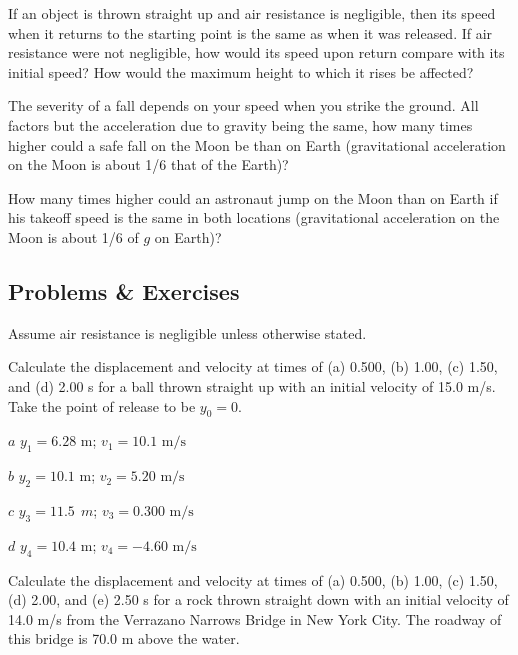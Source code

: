 \documentclass[
]{book}
\begin{document}
\hypertarget{fs-id1773324}{}
\leavevmode{}%
If an object is thrown straight up and air resistance is negligible,
then its speed when it returns to the starting point is the same as when
it was released. If air resistance were not negligible, how would its
speed upon return compare with its initial speed? How would the maximum
height to which it rises be affected?

\hypertarget{fs-id1776230}{}
\leavevmode{}%
The severity of a fall depends on your speed when you strike the ground.
All factors but the acceleration due to gravity being the same, how many
times higher could a safe fall on the Moon be than on Earth
(gravitational acceleration on the Moon is about 1/6 that of the Earth)?

\hypertarget{fs-id2271654}{}
\leavevmode{}%
How many times higher could an astronaut jump on the Moon than on Earth
if his takeoff speed is the same in both locations (gravitational
acceleration on the Moon is about 1/6 of \(g{}\) on Earth)?

\hypertarget{fs-id3514521}{}
\hypertarget{problems-exercises-4}{%
\subsection{Problems \& Exercises}\label{problems-exercises-4}}

Assume air resistance is negligible unless otherwise stated.

\hypertarget{fs-id1516821}{}
\leavevmode{}%
Calculate the displacement and velocity at times of (a) 0.500, (b) 1.00,
(c) 1.50, and (d) 2.00 s for a ball thrown straight up with an initial
velocity of 15.0 m/s. Take the point of release to be \({y_{0} = 0}{}\).

\leavevmode{}%
\(a\) \({{y_{1} = 6}\text{.}\text{28\ m}}{}\);
\({{v_{1} = \text{10}}\text{.}\text{1\ m/s}}{}\)

\(b\) \({{y_{2} = \text{10}}\text{.}\text{1\ m}}{}\);
\({{v_{2} = 5}\text{.}\text{20\ m/s}}{}\)

\(c\) \({{y_{3} = 11}\text{.}5\ \ m}{}\);
\({{v_{3} = 0}\text{.300\ m/s}}{}\)

\(d\) \({y_{4} = 10}\text{.4\ m}\); \({{v_{4} = {- 4}}\text{.60\ m/s}}{}\)

\hypertarget{fs-id1746555}{}
\leavevmode{}%
Calculate the displacement and velocity at times of (a) 0.500, (b) 1.00,
(c) 1.50, (d) 2.00, and (e) 2.50 s for a rock thrown straight down with
an initial velocity of 14.0 m/s from the Verrazano Narrows Bridge in New
York City. The roadway of this bridge is 70.0 m above the water.
\end{document}
